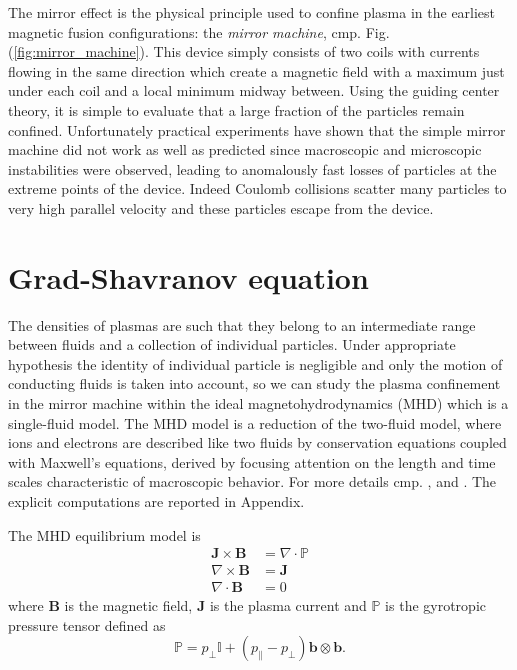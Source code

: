 The mirror effect is the physical principle used to confine plasma in the earliest magnetic fusion configurations: the \textit{mirror machine}, cmp. Fig.(\ref{fig:mirror_machine}). This device simply consists of two coils with currents flowing in the same direction which create a magnetic field with a maximum just under each coil and a local minimum midway between. Using the guiding center theory, it is simple to evaluate that a large fraction of the particles remain confined. Unfortunately practical experiments have shown that the simple mirror machine did not work as well as predicted since macroscopic and microscopic instabilities were observed, leading to anomalously fast losses of particles at the extreme points of the device. Indeed Coulomb collisions scatter many particles to very high parallel velocity and these particles escape from the device.

\section{Grad-Shavranov equation}\label{sec:grad_shavranov}
The densities of plasmas are such that they belong to an intermediate range between fluids and a collection of individual particles. Under appropriate hypothesis the identity of individual particle is negligible and only the motion of conducting fluids is taken into account, so we can study the plasma confinement in the mirror machine within the ideal magnetohydrodynamics (MHD) which is a single-fluid model. The MHD model is a reduction of the two-fluid model, where ions and electrons are described like two fluids by conservation equations coupled with Maxwell's equations, derived by focusing attention on the length and time scales characteristic of macroscopic behavior. For more details cmp. \cite{GUO}, \cite{plasma} and \cite{idealMHD}. The explicit computations are reported in Appendix.
\medskip

The MHD equilibrium model is
\begin{subequations}\label{eq:MHD_equlibrium}
  \begin{align}
    \label{eq:MHD_momentum}\mathbf{J}\times\mathbf{B}&=\nabla\cdot\mathbb{P}\\
    \label{eq:MHD_current}\nabla\times\mathbf{B}&=\mathbf{J}\\
    \label{eq:MHD_maxwell}\nabla\cdot\mathbf{B}&=0
  \end{align}
\end{subequations}
where $\mathbf{B}$ is the magnetic field, $\mathbf{J}$ is the plasma current and $\mathbb{P}$ is the gyrotropic pressure tensor defined as
\begin{equation}\label{eq:pressure_tensor}
  \mathbb{P}=p_\perp\mathbb{I}+(p_\parallel - p_\perp)\mathbf{b}\otimes\mathbf{b}.
\end{equation}

